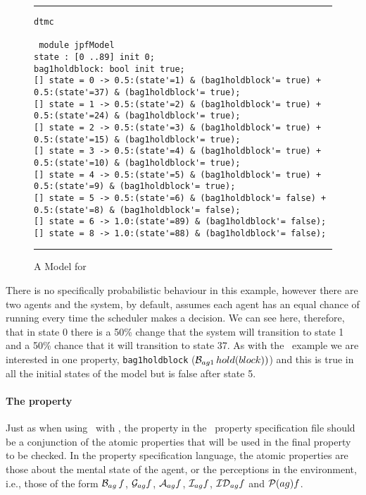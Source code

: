 \begin{figure}[htb]
\noindent\rule{\textwidth}{1pt}
\begin{small}
\begin{verbatim}
dtmc

 module jpfModel
state : [0 ..89] init 0;
bag1holdblock: bool init true;
[] state = 0 -> 0.5:(state'=1) & (bag1holdblock'= true) + 0.5:(state'=37) & (bag1holdblock'= true);
[] state = 1 -> 0.5:(state'=2) & (bag1holdblock'= true) + 0.5:(state'=24) & (bag1holdblock'= true);
[] state = 2 -> 0.5:(state'=3) & (bag1holdblock'= true) + 0.5:(state'=15) & (bag1holdblock'= true);
[] state = 3 -> 0.5:(state'=4) & (bag1holdblock'= true) + 0.5:(state'=10) & (bag1holdblock'= true);
[] state = 4 -> 0.5:(state'=5) & (bag1holdblock'= true) + 0.5:(state'=9) & (bag1holdblock'= true);
[] state = 5 -> 0.5:(state'=6) & (bag1holdblock'= false) + 0.5:(state'=8) & (bag1holdblock'= false);
[] state = 6 -> 1.0:(state'=89) & (bag1holdblock'= false);
[] state = 8 -> 1.0:(state'=88) & (bag1holdblock'= false);
\end{verbatim}
\end{small}
\rule{\textwidth}{1pt}
\caption{A Model for \prism}
\label{fig:prism_output1}
\end{figure}

There is no specifically probabilistic behaviour in this example, however there are two agents and the system, by default, assumes each agent has an equal chance of running every time the scheduler makes a decision.  We can see here, therefore, that in state 0 there is a 50\% change that the system will transition to state 1 and a 50\% chance that it will transition to state 37.  As with the \spin\ example we are interested in one property, \texttt{bag1holdblock} ($\mathrm{{\cal B}}_{ag1} \, hold(block))$) and this is true in all the initial states of the model but is false after state 5.

\paragraph{The property} Just as when using \ajpf\ with \spin, the property in the \ajpf\ property specification file should be a conjunction of the atomic properties that will be used in the final property to be checked.  In the property specification language, the atomic properties are those about the mental state of the agent, or the perceptions in the environment, i.e., those of the form $\mathrm{{\cal B}}_{ag} \, f$, $\mathrm{{\cal G}}_{ag} f$, $\mathrm{{\cal A}}_{ag} f$, $\mathrm{{\cal I}}_{ag} f$, $\mathrm{{\cal ID}}_{ag} f$ and $\mathrm{{\cal P}}(ag){f}$.

